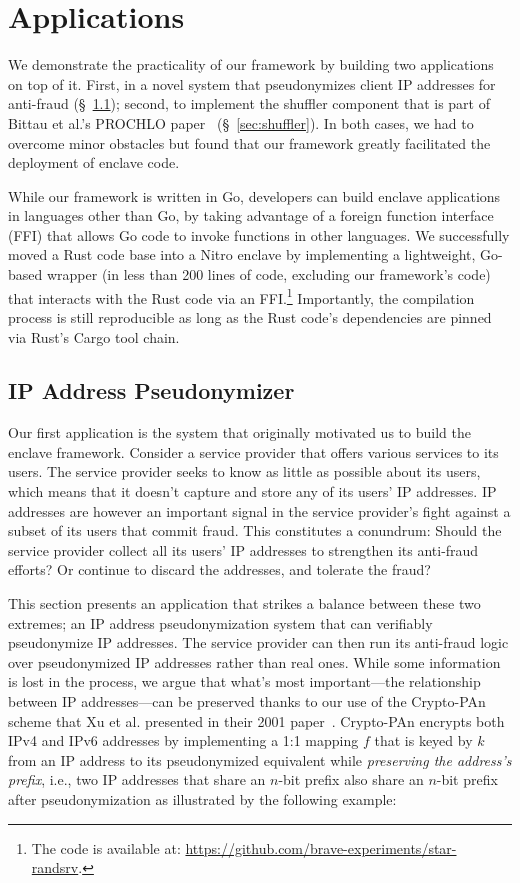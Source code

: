 \section{Applications}
\label{sec:applications}

We demonstrate the practicality of our framework by building two applications on
top of it.  First, in a novel system that pseudonymizes client IP addresses for
anti-fraud (\S~\ref{sec:pseudonymization}); second, to implement the shuffler
component that is part of Bittau et al.'s PROCHLO paper~\cite{Bittau2017a}
(\S~\ref{sec:shuffler}).  In both cases, we had to overcome minor obstacles but
found that our framework greatly facilitated the deployment of enclave code.

While our framework is written in Go, developers can build enclave applications
in languages other than Go, by taking advantage of a foreign function interface
(FFI) that allows Go code to invoke functions in other languages.  We
successfully moved a Rust code base into a Nitro enclave by implementing a
lightweight, Go-based wrapper (in less than 200 lines of code, excluding our
framework's code) that interacts with the Rust code via an FFI.\footnote{The
code is available at: \url{https://github.com/brave-experiments/star-randsrv}.}
Importantly, the compilation process is still reproducible as long
as the Rust code's dependencies are pinned via Rust's Cargo tool chain.

\subsection{IP Address Pseudonymizer}
\label{sec:pseudonymization}

Our first application is the system that originally motivated us to build the
enclave framework. Consider a service provider that offers various services to
its users.  The service provider seeks to know as little as possible about its
users, which means that it doesn't capture and store any of its users' IP
addresses.  IP addresses are however an important signal in the service
provider's fight against a subset of its users that commit fraud.  This
constitutes a conundrum: Should the service provider collect all its users' IP
addresses to strengthen its anti-fraud efforts?  Or continue to discard the
addresses, and tolerate the fraud?

This section presents an application that strikes a balance between these two
extremes; an IP address pseudonymization system that can verifiably pseudonymize
IP addresses.  The service provider can then run its anti-fraud logic over
pseudonymized IP addresses rather than real ones.  While some information is
lost in the process, we argue that what's most important---the relationship
between IP addresses---can be preserved thanks to our use of the Crypto-PAn
scheme that Xu et al. presented in their 2001 paper~\cite{Xu01a}.  Crypto-PAn
encrypts both IPv4 and IPv6 addresses by implementing a 1:1 mapping $f$ that is
keyed by $k$ from an IP address to its pseudonymized equivalent while
\emph{preserving the address's prefix}, i.e., two IP addresses that share an
$n$-bit prefix also share an $n$-bit prefix after pseudonymization as
illustrated by the following example:

